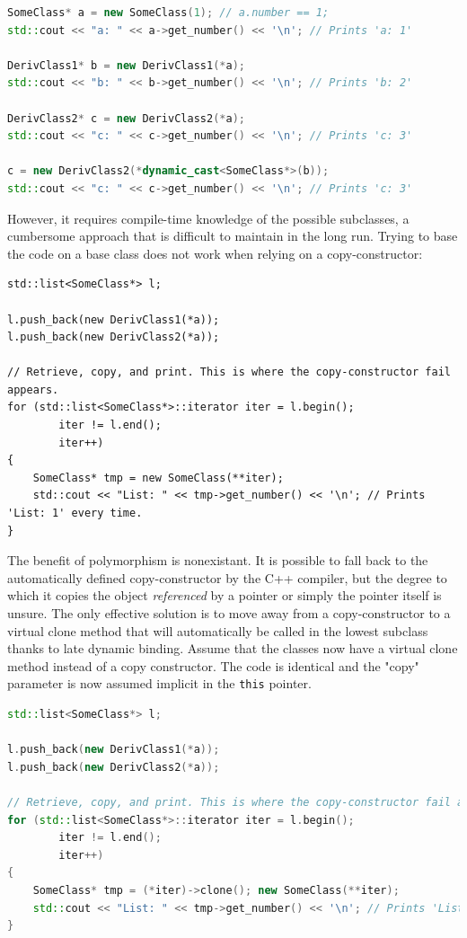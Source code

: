 \begin{lstlisting}[language=C++]
SomeClass* a = new SomeClass(1); // a.number == 1;
std::cout << "a: " << a->get_number() << '\n'; // Prints 'a: 1'

DerivClass1* b = new DerivClass1(*a);
std::cout << "b: " << b->get_number() << '\n'; // Prints 'b: 2'

DerivClass2* c = new DerivClass2(*a);
std::cout << "c: " << c->get_number() << '\n'; // Prints 'c: 3'

c = new DerivClass2(*dynamic_cast<SomeClass*>(b));
std::cout << "c: " << c->get_number() << '\n'; // Prints 'c: 3'
\end{lstlisting}

However, it requires compile-time knowledge of the possible subclasses, a cumbersome approach that is difficult to maintain in the long run. Trying to base the code on a base class does not work when relying on a copy-constructor:

\begin{lstlisting}
std::list<SomeClass*> l;

l.push_back(new DerivClass1(*a));
l.push_back(new DerivClass2(*a));
    
// Retrieve, copy, and print. This is where the copy-constructor fail appears.
for (std::list<SomeClass*>::iterator iter = l.begin();
        iter != l.end();
        iter++)
{
    SomeClass* tmp = new SomeClass(**iter);
    std::cout << "List: " << tmp->get_number() << '\n'; // Prints 'List: 1' every time.
}
\end{lstlisting}

The benefit of polymorphism is nonexistant. It is possible to fall back to the automatically defined copy-constructor by the C++ compiler, but the degree to which it copies the object \emph{referenced} by a pointer or simply the pointer itself is unsure. The only effective solution is to move away from a copy-constructor to a virtual clone method that will automatically be called in the lowest subclass thanks to late dynamic binding. Assume that the classes now have a virtual clone method instead of a copy constructor. The code is identical and the "copy" parameter is now assumed implicit in the \texttt{this} pointer.

\begin{lstlisting}[language=C++]
std::list<SomeClass*> l;

l.push_back(new DerivClass1(*a));
l.push_back(new DerivClass2(*a));
    
// Retrieve, copy, and print. This is where the copy-constructor fail appears.
for (std::list<SomeClass*>::iterator iter = l.begin();
        iter != l.end();
        iter++)
{
    SomeClass* tmp = (*iter)->clone(); new SomeClass(**iter);
    std::cout << "List: " << tmp->get_number() << '\n'; // Prints 'List: x', where x is the correct output from get_number()
}
\end{lstlisting}

